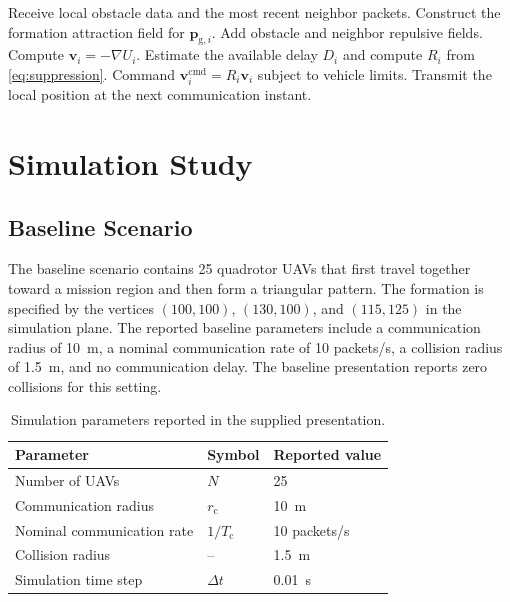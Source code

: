 \documentclass[journal]{IEEEtran}
\newcommand{\bp}{\bm{p}}
\newcommand{\bv}{\bm{v}}
\begin{document}
\begin{algorithm}
\caption{Local communication-aware APF update}
\label{alg:apf}
\begin{algorithmic}[1]
\State Receive local obstacle data and the most recent neighbor packets.
\State Construct the formation attraction field for $\bp_{\mathrm{g},i}$.
\State Add obstacle and neighbor repulsive fields.
\State Compute $\bv_i=-\nabla U_i$.
\State Estimate the available delay $D_i$ and compute $R_i$ from \eqref{eq:suppression}.
\State Command $\bv_i^{\mathrm{cmd}}=R_i\bv_i$ subject to vehicle limits.
\State Transmit the local position at the next communication instant.
\end{algorithmic}
\end{algorithm}

\section{Simulation Study}
\label{sec:simulation}
\subsection{Baseline Scenario}
The baseline scenario contains 25 quadrotor UAVs that first travel together toward a mission region and then form a triangular pattern. The formation is specified by the vertices $(100,100)$, $(130,100)$, and $(115,125)$ in the simulation plane. The reported baseline parameters include a communication radius of \SI{10}{m}, a nominal communication rate of 10 packets/s, a collision radius of \SI{1.5}{m}, and no communication delay. The baseline presentation reports zero collisions for this setting.

\begin{table}[t]
\caption{Simulation parameters reported in the supplied presentation.}
\label{tab:simulation_parameters}
\centering
\begin{tabular}{lll}
\toprule
Parameter & Symbol & Reported value \\
\midrule
Number of UAVs & $N$ & 25 \\
Communication radius & $r_{\mathrm{c}}$ & \SI{10}{m} \\
Nominal communication rate & $1/T_{\mathrm{c}}$ & 10 packets/s \\
Collision radius & -- & \SI{1.5}{m} \\
Simulation time step & $\Delta t$ & \SI{0.01}{s} \\
\bottomrule
\end{tabular}
\end{table}
\end{document}

